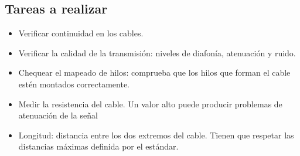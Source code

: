 \documentclass[11pt]{article}
\begin{document}
\subsection{Tareas a realizar}
\label{sec:orga4c4824}
\begin{itemize}
\item Verificar continuidad en los cables.
\item Verificar la calidad de la transmisión: niveles de diafonía, atenuación y ruido.
\item Chequear el mapeado de hilos: comprueba que los hilos que forman el cable estén montados correctamente.
\item Medir la resistencia del cable. Un valor alto puede producir problemas de atenuación de la señal
\item Longitud: distancia entre los dos extremos del cable. Tienen que respetar las distancias máximas definida por el estándar.
\end{itemize}
\end{document}
